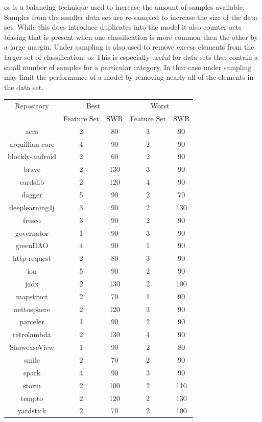 \gls{os} is a balancing technique used to increase the amount of samples available. Samples from the smaller data set are re-sampled to increase the size of the data set. While this does introduce duplicates into the model it also counter acts biasing that is present when one classification is more common then the other by a large margin. Under sampling is also used to remove excess elements from the larger set of classification. \gls{os} This is especially useful for data sets that contain a small number of samples for a particular category. In that case under sampling may limit the performance of a model by removing nearly all of the elements in the data set.

\begin{table}[ht]
\begin{center}

    \begin{tabular}{|c|c|c|c|c|}
        \hline
        Repository & \multicolumn{2}{c|}{Best} & \multicolumn{2}{c|}{Worst} \\ \cline{2-5}
         & Feature Set & SWR & Feature Set & SWR \\ 
        \hline
        acra & 2 & 80 & 3 & 90 \\
        arquillian-core & 4 & 90 & 2 & 90 \\
        blockly-android & 2 & 60 & 2 & 90 \\
        brave & 2 & 130 & 3 & 90 \\
        cardslib & 2 & 120 & 4 & 90 \\
        dagger & 5 & 90 & 2 & 70 \\
        deeplearning4j & 3 & 90 & 2 & 130 \\
        fresco & 3 & 90 & 2 & 90 \\
        governator & 1 & 90 & 3 & 90 \\
        greenDAO & 4 & 90 & 1 & 90 \\
        http-request & 2 & 80 & 3 & 90 \\
        ion & 5 & 90 & 2 & 90 \\
        jadx & 2 & 130 & 2 & 100 \\
        mapstruct & 2 & 70 & 1 & 90 \\
        nettosphere & 2 & 120 & 3 & 90 \\
        parceler & 1 & 90 & 2 & 90 \\
        retrolambda & 2 & 130 & 4 & 90 \\
        ShowcaseView & 1 & 90 & 2 & 80 \\
        smile & 2 & 70 & 2 & 90 \\
        spark & 4 & 90 & 3 & 90 \\
        storm & 2 & 100 & 2 & 110 \\
        tempto & 2 & 120 & 2 & 130 \\
        yardstick & 2 & 70 & 2 & 100 \\



\end{tabular}
\end{center}
\end{table}
